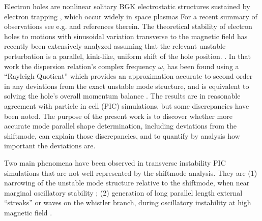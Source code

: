 \documentclass{jpp}
\begin{document}
Electron holes are nonlinear solitary BGK \citep{Bernstein1957}
electrostatic structures sustained by electron trapping
\citep{Hutchinson2017}, which occur widely in space plasmas For a
recent summary of observations see e.g. \citep{Lotekar2020} and
references therein.  The theoretical stability of electron holes to
motions with sinusoidal variation transverse to the magnetic field has
recently been extensively analyzed assuming that the relevant unstable
perturbation is a parallel, kink-like, uniform shift of the hole
position.
\citep{Hutchinson2018,Hutchinson2018a,Hutchinson2019,Hutchinson2019a}. In
that work the dispersion relation's complex frequency $\omega$, has
been found using a ``Rayleigh Quotient'' \citep{Parlett1974} which
provides an approximation accurate to second order in any deviations
from the exact unstable mode structure, and is equivalent to solving
the hole's overall momentum balance \citep{Hutchinson2016}. The
results are in reasonable agreement with particle in cell (PIC)
simulations, but some discrepancies have been noted. The purpose of
the present work is to discover whether more accurate mode parallel
shape determination, including deviations from the shiftmode, can
explain those discrepancies, and to quantify by analysis how important
the deviations are.

Two main phenomena have been observed in transverse instability PIC
simulations that are not well represented by the shiftmode
analysis. They are (1) narrowing of the unstable mode structure
relative to the shiftmode, when near marginal oscillatory
stability
\citep{Hutchinson2019}; (2) generation of long parallel length
external ``streaks'' or waves on the whistler branch, during
oscillatory instability at high magnetic field
\citep{Hutchinson2019a}.
\end{document}
